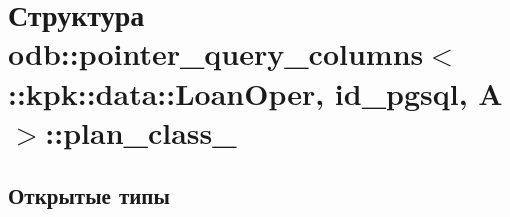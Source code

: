 \hypertarget{structodb_1_1pointer__query__columns_3_01_1_1kpk_1_1data_1_1_loan_oper_00_01id__pgsql_00_01_a_01_4_1_1plan__class__}{}\section{Структура odb\+:\+:pointer\+\_\+query\+\_\+columns$<$ \+:\+:kpk\+:\+:data\+:\+:Loan\+Oper, id\+\_\+pgsql, A $>$\+:\+:plan\+\_\+class\+\_\+}
\label{structodb_1_1pointer__query__columns_3_01_1_1kpk_1_1data_1_1_loan_oper_00_01id__pgsql_00_01_a_01_4_1_1plan__class__}
\subsection*{Открытые типы}
